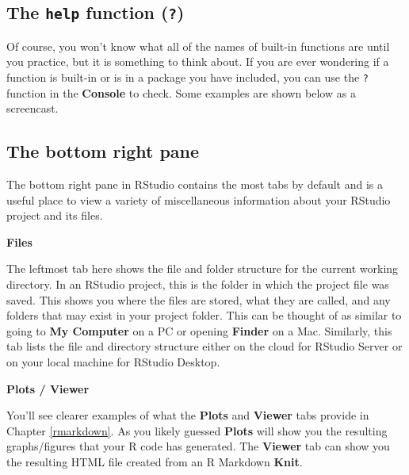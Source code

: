 \documentclass[]{tufte-book}
\begin{document}
\hypertarget{the-help-function}{%
\subsection{\texorpdfstring{The \texttt{help} function (\texttt{?})}{The help function (?)}}\label{the-help-function}}

Of course, you won't know what all of the names of built-in functions are until you practice, but it is something to think about. If you are ever wondering if a function is built-in or is in a package you have included, you can use the \texttt{?} function in the \textbf{Console} to check. Some examples are shown below as a screencast.

\hypertarget{the-bottom-right-pane}{%
\subsection{The bottom right pane}\label{the-bottom-right-pane}}

The bottom right pane in RStudio contains the most tabs by default and is a useful place to view a variety of miscellaneous information about your RStudio project and its files.

\vspace*{0.2in}

\noindent\textbf{Files}\vspace*{0.1in}

The leftmost tab here shows the file and folder structure for the current working directory. In an RStudio project, this is the folder in which the project file was saved. This shows you where the files are stored, what they are called, and any folders that may exist in your project folder. This can be thought of as similar to going to \textbf{My Computer} on a PC or opening \textbf{Finder} on a Mac. Similarly, this tab lists the file and directory structure either on the cloud for RStudio Server or on your local machine for RStudio Desktop.

\vspace*{0.2in}

\noindent\textbf{Plots / Viewer}\vspace*{0.1in}

You'll see clearer examples of what the \textbf{Plots} and \textbf{Viewer} tabs provide in Chapter \ref{rmarkdown}. As you likely guessed \textbf{Plots} will show you the resulting graphs/figures that your R code has generated. The \textbf{Viewer} tab can show you the resulting HTML file created from an R Markdown \textbf{Knit}.
\end{document}
